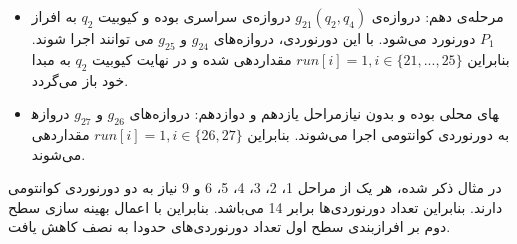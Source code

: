 \begin{itemize}
\item
مرحله‌ی دهم: دروازه‌ی  $g_{21}(q_2,q_4)$ دروازه‌ی سراسری بوده و کیوبیت $q_2$ به افراز $P_1$ دورنورد می‌شود. با این دورنوردی، دروازه‌های $g_{24} $ و $g_{25}$ می توانند اجرا شوند. بنابراین $run[i]=1,i \in \{21,...,25\}$ مقداردهی شده و در نهایت کیوبیت $q_2 $ به مبدا خود باز می‌گردد.
\item
مراحل یازدهم و دوازدهم: دروازه‌های $g_{26}$ و $g_{27}$ دروازه‎های محلی بوده و بدون نیاز به دورنوردی کوانتومی اجرا می‌شوند. بنابراین  $run[i]=1,i \in \{26,27\}$ مقداردهی می‌شوند.

\end{itemize} 
در مثال ذکر شده، هر یک از مراحل 1، 2، 3، 4، 5، 6 و 9 نیاز به دو دورنوردی کوانتومی دارند. بنابراین تعداد دورنوردی‌ها برابر 14 می‌باشد. بنابراین با اعمال بهینه سازی سطح دوم بر افرازبندی سطح اول تعداد دورنوردی‌های حدودا به نصف کاهش یافت.

